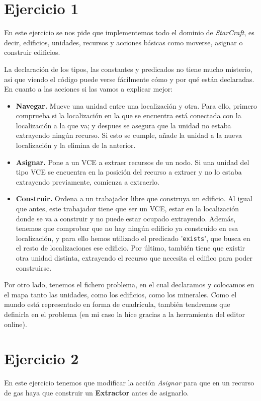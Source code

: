 \documentclass[11pt,a4paper]{article}
\begin{document}
\section*{Ejercicio 1}
En este ejercicio se nos pide que implementemos todo el dominio de \textit{StarCraft}, es decir, edificios, unidades, recursos y
acciones básicas como moverse, asignar o construir edificios.

La declaración de los tipos, las constantes y predicados no tiene mucho misterio, asi que viendo el código puede verse fácilmente
cómo y por qué están declaradas. En cuanto a las acciones si las vamos a explicar mejor:

\begin{itemize}
    \item \textbf{Navegar.} Mueve una unidad entre una localización y otra. Para ello, primero comprueba si la localización en la
          que se encuentra está conectada con la localización a la que va; y despues se asegura que la unidad no estaba extrayendo
          ningún recurso. Si esto se cumple, añade la unidad a la nueva localización y la elimina de la anterior.
    \item \textbf{Asignar.} Pone a un VCE a extraer recursos de un nodo. Si una unidad del tipo VCE se encuentra en la posición
          del recurso a extraer y no lo estaba extrayendo previamente, comienza a extraerlo.
    \item \textbf{Construir.} Ordena a un trabajador libre que construya un edificio. Al igual que antes, este trabajador tiene
          que ser un VCE, estar en la localización donde se va a construir y no puede estar ocupado extrayendo. Además, tenemos
          que comprobar que no hay ningún edificio ya construido en esa localización, y para ello hemos utilizado el predicado
          '\texttt{exists}', que busca en el resto de localizaciones ese edificio. Por último, también tiene que existir otra
          unidad distinta, extrayendo el recurso que necesita el edifico para poder construirse.
\end{itemize}

Por otro lado, tenemos el fichero problema, en el cual declaramos y colocamos en el mapa tanto las unidades, como los edificios,
como los minerales. Como el mundo está representado en forma de cuadrícula, también tendremos que definirla en el problema
(en mi caso la hice gracias a la herramienta del editor online).


\section*{Ejercicio 2}
En este ejercicio tenemos que modificar la acción \textit{Asignar} para que en un recurso de gas haya que construir un \textbf{
Extractor} antes de asignarlo.
\end{document}
